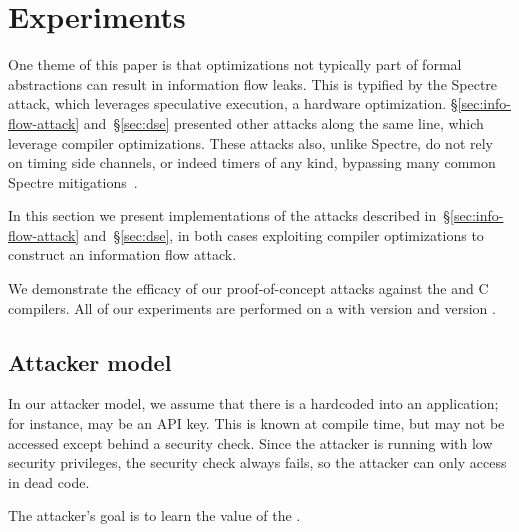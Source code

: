 \section{Experiments}
\label{sec:experiments}

One theme of this paper is that optimizations not typically part of formal
abstractions can result in information flow leaks.
This is typified by the Spectre attack, which leverages speculative execution,
a hardware optimization.
\S\ref{sec:info-flow-attack} and~\S\ref{sec:dse} presented other attacks
along the same line, which leverage compiler optimizations.
These attacks also, unlike Spectre, do not rely on timing side channels, or
indeed timers of any kind, bypassing many common Spectre mitigations~\cite{???}.

In this section we present implementations of the attacks described
in~\S\ref{sec:info-flow-attack} and~\S\ref{sec:dse}, in both cases
exploiting compiler optimizations to construct an information flow attack.
We demonstrate the efficacy of our proof-of-concept attacks against
the {\CLANG} and {\GCC} C compilers.
All of our experiments are performed on a  with
{\CLANG} version  and {\GCC} version .

\subsection{Attacker model}
\label{subsec:attacker-model}

In our attacker model, we assume that there is a {\SEC} hardcoded into an
application; for instance, {\SEC} may be an API key.
This {\SEC} is known at compile time, but may not be
accessed except behind a security check.
Since the attacker is running with low security privileges,
the security check always fails,
so the attacker can only access {\SEC} in dead code.
The attacker's goal is to learn the value of the {\SEC}.

